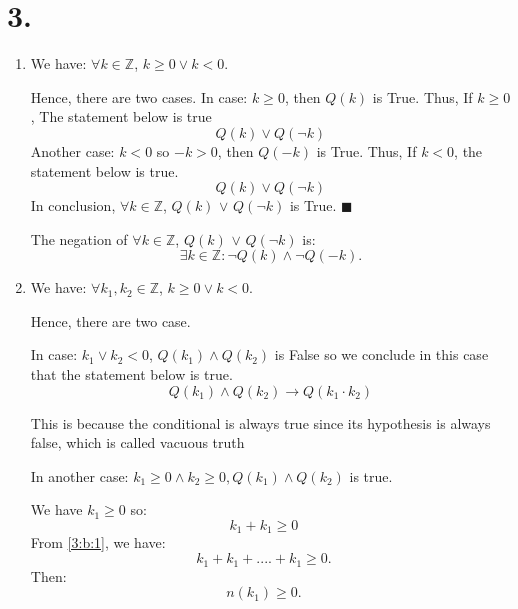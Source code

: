 \documentclass{article}
\renewcommand{\a}{\land}
\renewcommand{\o}{\lor}
\newcommand{\n}{\neg}
\begin{document}
	\section*{3. }
	\begin{enumerate}[label=({\alph*})]
		\item We have: $ \forall k \in  \mathbb{Z} $, $ k \geq 0 \o k < 0 $.
		
		Hence, there are two cases.
		 In case: $ k \geq 0$, then $ Q(k) $ is True. Thus, If $ k \geq 0 $, The statement below is true
		 \begin{equation}
			Q(k) \o Q(\n k) 
		 \end{equation} 
		  Another case: $ k < 0$ so $-k > 0 $, then $Q(-k)$ is True. Thus, If $k < 0$, the statement below is true.
		  \begin{equation}
		   	Q(k) \o Q(\n k) 
		  \end{equation}
		 In conclusion,  $\forall k \in  \mathbb{Z}$, $ Q(k)$ $\o$ $Q(\n k)$ is True. \(\blacksquare\)
		
		 The negation of $\forall k \in  \mathbb{Z}$, $ Q(k)$ $\o$ $Q(\n k)$ is:
		 $$\exists k \in \mathbb{Z}: \n Q(k) \a \n Q(-k). $$

	

		\item We have: $ \forall k_{1}, k_{2} \in \mathbb{Z}$,  $ k \geq 0 \o k < 0 $.
		
		Hence, there are two case.

		In case: $k_{1}\o k_{2} < 0$, $Q(k_{1}) \a Q(k_{2})$ is False so we conclude in this case that the statement below is true.
		\begin{equation}
			Q(k_{1}) \a Q(k_{2}) \to Q(k_{1} \cdot k_{2}) 
		\end{equation}
		 
		
		This is because the conditional is always
		true since its hypothesis is always false, which is called vacuous truth
		
	 	In another case: $k_{1} \geq 0 \a k_{2} \geq 0, Q(k_{1}) \a Q(k_{2})$ is true.
		
		We have $ k_{1} \geq 0$ so:
		\begin{equation}
			k_{1} + k_{1} \geq 0  \quad \label{3:b:1}
		\end{equation}
		From \eqref{3:b:1}, we have:
		\begin{equation}
			k_{1} +k_{1} + .... +k_{1}\geq 0. \quad \label{3:b:2}
		\end{equation}
		Then:
		\begin{equation}
		  n(k_{1}) \geq 0. \quad \label{3:b:3}
		\end{equation}
		

\end{enumerate}
\end{document}
